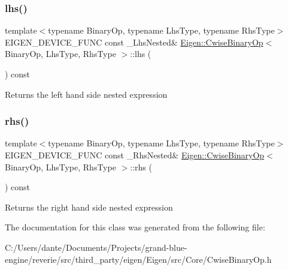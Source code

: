 \subsubsection{\texorpdfstring{lhs()}{lhs()}}
{\footnotesize\ttfamily template$<$typename Binary\+Op, typename Lhs\+Type, typename Rhs\+Type$>$ \\
E\+I\+G\+E\+N\+\_\+\+D\+E\+V\+I\+C\+E\+\_\+\+F\+U\+NC const \+\_\+\+Lhs\+Nested\& \mbox{\hyperlink{class_eigen_1_1_cwise_binary_op}{Eigen\+::\+Cwise\+Binary\+Op}}$<$ Binary\+Op, Lhs\+Type, Rhs\+Type $>$\+::lhs (\begin{DoxyParamCaption}{ }\end{DoxyParamCaption}) const\hspace{0.3cm}{\ttfamily [inline]}}

\begin{DoxyReturn}{Returns}
the left hand side nested expression 
\end{DoxyReturn}
\mbox{\label{class_eigen_1_1_cwise_binary_op_a3a61cbdf6d1adaa62f012045b04b6d09}} 
\subsubsection{\texorpdfstring{rhs()}{rhs()}}
{\footnotesize\ttfamily template$<$typename Binary\+Op, typename Lhs\+Type, typename Rhs\+Type$>$ \\
E\+I\+G\+E\+N\+\_\+\+D\+E\+V\+I\+C\+E\+\_\+\+F\+U\+NC const \+\_\+\+Rhs\+Nested\& \mbox{\hyperlink{class_eigen_1_1_cwise_binary_op}{Eigen\+::\+Cwise\+Binary\+Op}}$<$ Binary\+Op, Lhs\+Type, Rhs\+Type $>$\+::rhs (\begin{DoxyParamCaption}{ }\end{DoxyParamCaption}) const\hspace{0.3cm}{\ttfamily [inline]}}

\begin{DoxyReturn}{Returns}
the right hand side nested expression 
\end{DoxyReturn}


The documentation for this class was generated from the following file\+:\begin{DoxyCompactItemize}
\item 
C\+:/\+Users/dante/\+Documents/\+Projects/grand-\/blue-\/engine/reverie/src/third\+\_\+party/eigen/\+Eigen/src/\+Core/Cwise\+Binary\+Op.\+h\end{DoxyCompactItemize}
